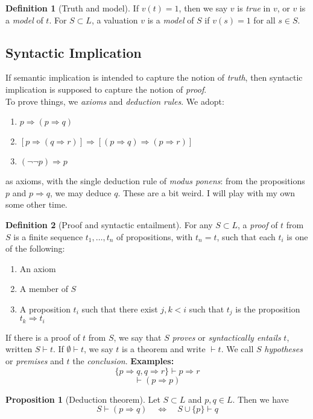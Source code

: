 \documentclass{article}
\theoremstyle{definition}
\newtheorem{definition}{Definition}
\newtheorem{proposition}{Proposition}
\numberwithin{definition}{section}
\newcommand{\proves}{\vdash}
\begin{document}
\begin{definition}[Truth and model]
If $v(t)=1$, then we say $v$ is \textit{true} in $v$, or $v$ is a \textit{model} of $t$. For $S \subset L$, a valuation $v$ is a \textit{model} of $S$ if $v(s)=1$ for all $s \in S$.
\end{definition}

\subsection{Syntactic Implication}
If semantic implication is intended to capture the notion of \textit{truth}, then syntactic implication is supposed to capture the notion of \textit{proof}. \\
To prove things, we \textit{axioms} and \textit{deduction rules}. We adopt:
\begin{enumerate}
\item $p \Rightarrow (p \Rightarrow q)$
\item $[p \Rightarrow (q \Rightarrow r)] \Rightarrow [(p \Rightarrow q) \Rightarrow (p \Rightarrow r)] $
\item $(\neg \neg p) \Rightarrow p$
\end{enumerate}
as axioms, with the single deduction rule of \textit{modus ponens}: from the propositions $p$ and $p \Rightarrow q$, we may deduce $q$. These are a bit weird. I will play with my own some other time. 
\begin{definition}[Proof and syntactic entailment]
For any $S \subset L$, a \textit{proof} of $t$ from $S$ is a finite sequence $t_{1},\ldots,t_{n}$ of propositions, with $t_{n}=t$, such that each $t_{i}$ is one of the following:
\begin{enumerate}[i]
\item An axiom
\item A member of $S$
\item A proposition $t_{i}$ such that there exist $j,k<i$ such that $t_{j}$ is the proposition $t_{k} \Rightarrow t_{i}$
\end{enumerate}
\end{definition}
If there is a proof of $t$ from $S$, we say that $S$ \textit{proves} or \textit{syntactically entails} $t$, written $S \proves t$. If $\emptyset \proves t$, we say $t$ is a theorem and write $\proves t$. We call $S$ \textit{hypotheses} or \textit{premises} and $t$ the \textit{conclusion}. 
\textbf{Examples:}
$$\{p \Rightarrow q,q \Rightarrow r\} \proves p \Rightarrow r$$
$$\proves (p \Rightarrow p)$$ 
\begin{proposition}[Deduction theorem]
Let $S \subset L$ and $p,q \in L$. Then we have 
$$S \proves (p \Rightarrow q) \quad \iff \quad S \cup \{p\} \proves q$$
\end{proposition}
\end{document}
